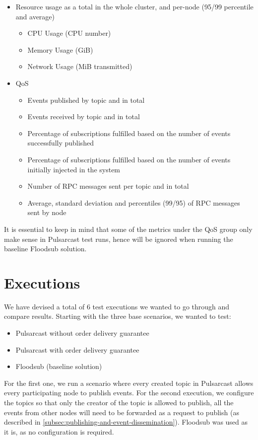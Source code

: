 \begin{itemize}
  \item Resource usage as a total in the whole cluster, and per-node (95/99
  percentile and average)
  \begin{itemize}
    \item CPU Usage (CPU number)
    \item Memory Usage (GiB)
    \item Network Usage (MiB transmitted)
  \end{itemize}
  \item QoS
  \begin{itemize}
    \item Events published by topic and in total
    \item Events received by topic and in total
    \item Percentage of subscriptions fulfilled based on the number of events
    successfully published
    \item Percentage of subscriptions fulfilled based on the number of events
    initially injected in the system
    \item Number of RPC messages sent per topic and in total
    \item Average, standard deviation and percentiles (99/95) of RPC messages
    sent by node
  \end{itemize}
\end{itemize}

It is essential to keep in mind that some of the metrics under the QoS group
only make sense in Pulsarcast test runs, hence will be ignored when running the
baseline Floodsub solution.

\section{Executions}\label{executions}

We have devised a total of 6 test executions we wanted to go through and
compare results. Starting with the three base scenarios, we wanted to test:

\begin{itemize}
  \item Pulsarcast without order delivery guarantee
  \item Pulsarcast with order delivery guarantee
  \item Floodsub (baseline solution)
\end{itemize}

For the first one, we run a scenario where every created topic in Pulsarcast
allows every participating node to publish events. For the second execution, we
configure the topics so that only the creator of the topic is allowed to
publish, all the events from other nodes will need to be forwarded as a request
to publish (as described in \ref{subsec:publishing-and-event-dissemination}).
Floodsub was used as it is, as no configuration is required. 

